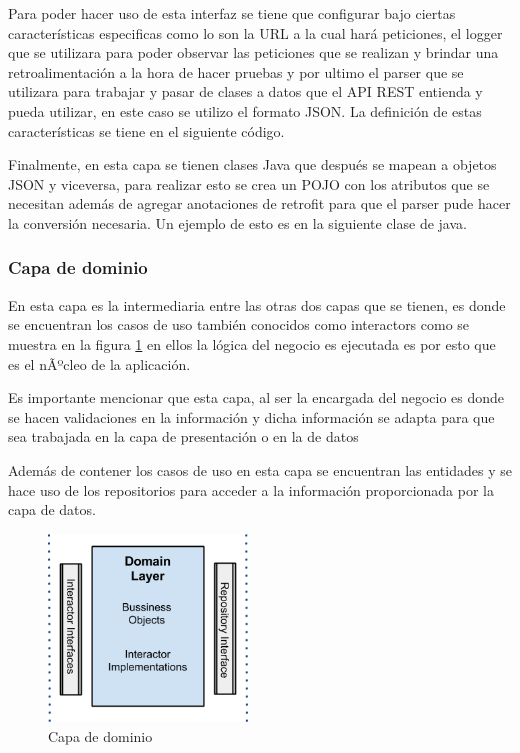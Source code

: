 %

Para poder hacer uso de esta interfaz se tiene que configurar bajo ciertas características especificas como lo son la URL a la cual hará peticiones, el logger que se utilizara para poder observar las peticiones que se realizan y brindar una retroalimentación a la hora de hacer pruebas y por ultimo el parser que se utilizara para trabajar y pasar de clases a datos que el API REST entienda y pueda utilizar, en este caso se utilizo el formato JSON. La definición de estas características se tiene en el siguiente código.

%

Finalmente, en esta capa se tienen clases Java que después se mapean a objetos JSON y viceversa, para realizar esto se crea un POJO con los atributos que se necesitan además de agregar anotaciones de retrofit para que el parser pude hacer la conversión necesaria. Un ejemplo de esto es en la siguiente clase de java.

%


\subsubsection{Capa de dominio}
En esta capa es la intermediaria entre las otras dos capas que se tienen, es donde se encuentran los casos de uso también conocidos como interactors como se muestra en la figura \ref{fig:capa-dominio} en ellos la lógica del negocio es ejecutada es por esto que es el nÃºcleo de la aplicación.

Es importante mencionar que esta capa, al ser la encargada del negocio es donde se hacen validaciones en la información y dicha información se adapta para que sea trabajada en la capa de presentación o en la de datos

Además de contener los casos de uso en esta capa se encuentran las entidades y se hace uso de los repositorios para acceder a la información proporcionada por la capa de datos.

\begin{figure}[h]
	\centering
	\includegraphics[width=200px]{capitulo5/android/img/capa-dominio.png}
	\caption{Capa de dominio \cite{cleanWay}}
	\label{fig:capa-dominio}
\end{figure}

